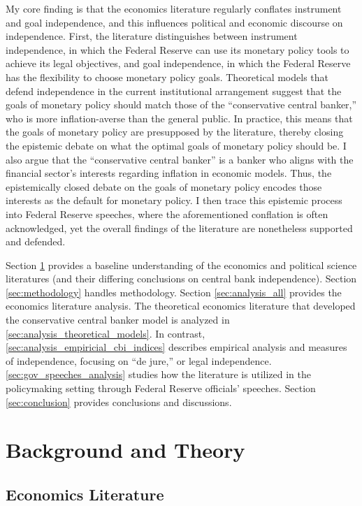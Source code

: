 \documentclass[12pt,a4paper]{article}
\begin{document}
\begin{doublespace}
My core finding is that the economics literature regularly conflates instrument and goal independence, and this influences political and economic discourse on independence. First, the literature distinguishes between instrument independence, in which the Federal Reserve can use its monetary policy tools to achieve its legal objectives, and goal independence, in which the Federal Reserve has the flexibility to choose monetary policy goals. Theoretical models that defend independence in the current institutional arrangement suggest that the goals of monetary policy should match those of the ``conservative central banker,'' who is more inflation-averse than the general public. In practice, this means that the goals of monetary policy are presupposed by the literature, thereby closing the epistemic debate on what the optimal goals of monetary policy should be. I also argue that the ``conservative central banker'' is a banker who aligns with the financial sector's interests regarding inflation in economic models. Thus, the epistemically closed debate on the goals of monetary policy encodes those interests as the default for monetary policy. I then trace this epistemic process into Federal Reserve speeches, where the aforementioned conflation is often acknowledged, yet the overall findings of the literature are nonetheless supported and defended. 

Section \ref{sec:background_all} provides a baseline understanding of the economics and political science literatures (and their differing conclusions on central bank independence). Section \ref{sec:methodology} handles methodology. Section \ref{sec:analysis_all} provides the economics literature analysis. The theoretical economics literature that developed the conservative central banker model is analyzed in \ref{sec:analysis_theoretical_models}. In contrast, \ref{sec:analysis_empiricial_cbi_indices} describes empirical analysis and measures of independence, focusing on ``de jure,'' or legal independence. \ref{sec:gov_speeches_analysis} studies how the literature is utilized in the policymaking setting through Federal Reserve officials' speeches. Section \ref{sec:conclusion} provides conclusions and discussions.


\section{Background and Theory}
\label{sec:background_all}

\subsection{Economics Literature}
\label{sec:background_economics}


\end{doublespace}
\end{document}
